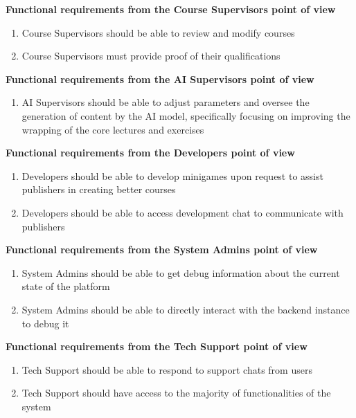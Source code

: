 \textbf{Functional requirements from the Course Supervisors point of view}
\begin{enumerate}[start=22,label={\bfseries FR \arabic*.}]
	\item Course Supervisors should be able to review and modify courses
	\item Course Supervisors must provide proof of their qualifications
\end{enumerate}

\textbf{Functional requirements from the AI Supervisors point of view}
\begin{enumerate}[start=24,label={\bfseries FR \arabic*.}]
	\item AI Supervisors should be able to adjust parameters and oversee the generation of content by the AI model, specifically focusing on improving the wrapping of the core lectures and exercises
\end{enumerate}

\textbf{Functional requirements from the Developers point of view}
\begin{enumerate}[start=25,label={\bfseries FR \arabic*.}]
	\item Developers should be able to develop minigames upon request to assist publishers in creating better courses
	\item Developers should be able to access development chat to communicate with publishers
\end{enumerate}

\textbf{Functional requirements from the System Admins point of view}
\begin{enumerate}[start=27,label={\bfseries FR \arabic*.}]
	\item System Admins should be able to get debug information about the current state of the platform
	\item System Admins should be able to directly interact with the backend instance to debug it
\end{enumerate}

\textbf{Functional requirements from the Tech Support point of view}
\begin{enumerate}[start=29,label={\bfseries FR \arabic*.}]
	\item Tech Support should be able to respond to support chats from users
	\item Tech Support should have access to the majority of functionalities of the system
\end{enumerate}

